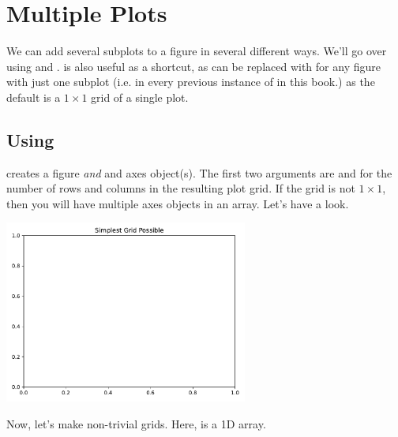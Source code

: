 


\section{Multiple Plots}

We can add several subplots to a figure in several different ways. We'll go over using  and .  is also useful as a shortcut, as  can be replaced with  for any figure with just one subplot (i.e. in every previous instance of  in this book.) as the default is a $1\times 1$ grid of a single plot. 

\subsection{Using }
 creates a figure \emph{and} and axes object(s). The first two arguments are  and  for the number of rows and columns in the resulting plot grid. If the grid is not $1\times1$, then you will have multiple axes objects in an array. Let's have a look.


\begin{center}
    \includegraphics[width = 0.6\textwidth]{figures/proseplots/trivial-sub.pdf}
\end{center}

Now, let's make non-trivial grids. Here,  is a 1D array.


